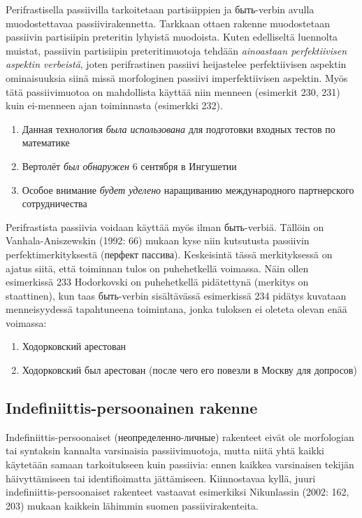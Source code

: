\documentclass[]{scrreprt}
\providecommand{\tightlist}{%
  \setlength{\itemsep}{0pt}\setlength{\parskip}{0pt}}
\begin{document}
Perifrastisella passiivilla tarkoitetaan partisiippien ja быть-verbin
avulla muodostettavaa passiivirakennetta. Tarkkaan ottaen rakenne
muodostetaan passiivin partisiipin preteritin lyhyistä muodoista. Kuten
edelliseltä luennolta muistat, passiivin partisiipin preteritimuotoja
tehdään \emph{ainoastaan perfektiivisen aspektin verbeistä}, joten
perifrastinen passiivi heijastelee perfektiivisen aspektin ominaisuuksia
siinä missä morfologinen passiivi imperfektiivisen aspektin. Myös tätä
passiivimuotoa on mahdollista käyttää niin menneen (esimerkit 230, 231)
kuin ei-menneen ajan toiminnasta (esimerkki 232).

\begin{enumerate}
\def\labelenumi{(\arabic{enumi})}
\setcounter{enumi}{229}
\tightlist
\item
  Данная технология \emph{была использована} для подготовки входных
  тестов по математике
\item
  Вертолёт \emph{был обнаружен} 6 сентября в Ингушетии
\item
  Особое внимание \emph{будет уделено} наращиванию международного
  партнерского сотрудничества
\end{enumerate}

Perifrastista passiivia voidaan käyttää myös ilman быть-verbiä. Tällöin
on Vanhala-Aniszewskin (1992: 66) mukaan kyse niin kutsutusta passiivin
perfektimerkityksestä (перфект пассива). Keskeisintä tässä merkityksessä
on ajatus siitä, että toiminnan tulos on puhehetkellä voimassa. Näin
ollen esimerkissä 233 Hodorkovski on puhehetkellä pidätettynä (merkitys
on staattinen), kun taas быть-verbin sisältävässä esimerkissä 234
pidätys kuvataan menneisyydessä tapahtuneena toimintana, jonka tuloksen
ei oleteta olevan enää voimassa:

\begin{enumerate}
\def\labelenumi{(\arabic{enumi})}
\setcounter{enumi}{232}
\tightlist
\item
  Ходорковский арестован
\item
  Ходорковский был арестован (после чего его повезли в Москву для
  допросов)
\end{enumerate}

\subsection{Indefiniittis-persoonainen
rakenne}\label{indefiniittis-persoonainen-rakenne}

Indefiniittis-persoonaiset (неопределенно-личные) rakenteet eivät ole
morfologian tai syntaksin kannalta varsinaisia passiivimuotoja, mutta
niitä yhtä kaikki käytetään samaan tarkoitukseen kuin passiivia: ennen
kaikkea varsinaisen tekijän häivyttämiseen tai identifioimatta
jättämiseen. Kiinnostavaa kyllä, juuri indefiniittis-persoonaiset
rakenteet vastaavat esimerkiksi Nikunlassin (2002: 162, 203) mukaan
kaikkein lähimmin suomen passiivirakenteita.
\end{document}

